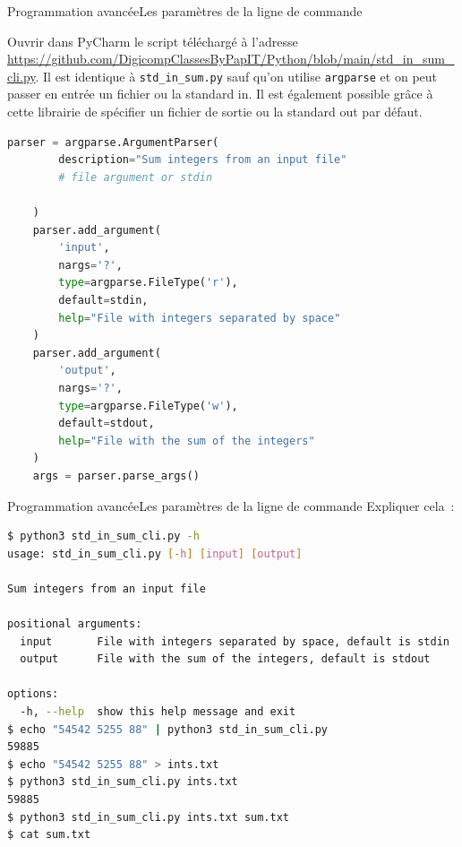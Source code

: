 \documentclass{beamer}
\begin{document}
    \begin{frame}[fragile]{Programmation avancée}{Les paramètres de la ligne de commande}
        \begin{footnotesize}
            Ouvrir dans PyCharm le script téléchargé à l'adresse \url{https://github.com/DigicompClassesByPapIT/Python/blob/main/std_in_sum_cli.py}.
            Il est identique à \lstinline{std_in_sum.py} sauf qu'on utilise \lstinline{argparse} et on peut passer en entrée un fichier ou la standard in.
            Il est également possible grâce à cette librairie de spécifier un fichier de sortie ou la standard out par défaut.
        \end{footnotesize}
        \begin{lstlisting}[language=Python,basicstyle=\tiny\ttfamily]
    parser = argparse.ArgumentParser(
        description="Sum integers from an input file"
        # file argument or stdin

    )
    parser.add_argument(
        'input',
        nargs='?',
        type=argparse.FileType('r'),
        default=stdin,
        help="File with integers separated by space"
    )
    parser.add_argument(
        'output',
        nargs='?',
        type=argparse.FileType('w'),
        default=stdout,
        help="File with the sum of the integers"
    )
    args = parser.parse_args()
        \end{lstlisting}
    \end{frame}

    \begin{frame}[fragile]{Programmation avancée}{Les paramètres de la ligne de commande}
        Expliquer cela~:
        \begin{lstlisting}[language=Bash]
$ python3 std_in_sum_cli.py -h
usage: std_in_sum_cli.py [-h] [input] [output]

Sum integers from an input file

positional arguments:
  input       File with integers separated by space, default is stdin
  output      File with the sum of the integers, default is stdout

options:
  -h, --help  show this help message and exit
$ echo "54542 5255 88" | python3 std_in_sum_cli.py
59885
$ echo "54542 5255 88" > ints.txt
$ python3 std_in_sum_cli.py ints.txt
59885
$ python3 std_in_sum_cli.py ints.txt sum.txt
$ cat sum.txt
        \end{lstlisting}
    \end{frame}
\end{document}
